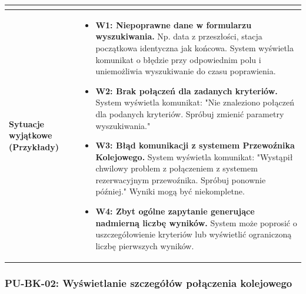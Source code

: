 \documentclass[a4paper,12pt]{article}
\begin{document}
\begin{longtable}{|p{\pierwszakolumnaszerokoscPUBKWyszukiwanie}|p{\drugakolumnaszerokoscPUBKWyszukiwanie}|}
\begin{itemize}
        \end{itemize} \\
    \hline
    \textbf{Sytuacje wyjątkowe (Przykłady)} &
        \begin{itemize} \itemsep0pt \parskip0pt \parsep0pt
            \item \textbf{W1: Niepoprawne dane w formularzu wyszukiwania.} Np. data z przeszłości, stacja początkowa identyczna jak końcowa. System wyświetla komunikat o błędzie przy odpowiednim polu i uniemożliwia wyszukiwanie do czasu poprawienia.
            \item \textbf{W2: Brak połączeń dla zadanych kryteriów.} System wyświetla komunikat: "Nie znaleziono połączeń dla podanych kryteriów. Spróbuj zmienić parametry wyszukiwania."
            \item \textbf{W3: Błąd komunikacji z systemem Przewoźnika Kolejowego.} System wyświetla komunikat: "Wystąpił chwilowy problem z połączeniem z systemem rezerwacyjnym przewoźnika. Spróbuj ponownie później." Wyniki mogą być niekompletne.
            \item \textbf{W4: Zbyt ogólne zapytanie generujące nadmierną liczbę wyników.} System może poprosić o uszczegółowienie kryteriów lub wyświetlić ograniczoną liczbę pierwszych wyników.
        \end{itemize} \\
\end{longtable}
\endgroup

\subsubsection{PU-BK-02: Wyświetlanie szczegółów połączenia kolejowego}

\begingroup %
\small %
\renewcommand{\arraystretch}{1.2} %

\newlength{\pierwszakolumnaszerokoscPUBKSzczegoly}
\setlength{\pierwszakolumnaszerokoscPUBKSzczegoly}{4.0cm}

\newlength{\drugakolumnaszerokoscPUBKSzczegoly}
\setlength{\drugakolumnaszerokoscPUBKSzczegoly}{\dimexpr\textwidth-\pierwszakolumnaszerokoscPUBKSzczegoly-2\tabcolsep-3\arrayrulewidth\relax}
\end{document}
